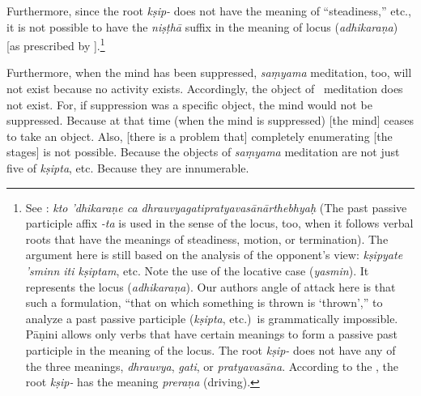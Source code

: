 Furthermore,%
 since the root \emph{kṣip-} does not have the
meaning of ``steadiness,'' etc., it is not possible to have the \emph{%
  niṣṭhā} suffix in the meaning of locus (\emph{adhikaraṇa}) [as prescribed by {%
  \Panini}].\footnote{See : \emph{kto ’dhikaraṇe ca dhrauvyagatipratyavasānārthebhyaḥ} (The past passive participle affix \emph{-ta\/} is used in the sense of the locus, too, when it follows verbal roots that have the meanings of steadiness, motion, or termination).  The argument here is still based on the analysis of the opponent's view: \emph{kṣipyate ’sminn iti kṣiptam}, etc.  Note the use of the locative case (\emph{yasmin}).  It represents the locus (\emph{adhikaraṇa}).  Our authors angle of attack here is that such a formulation, ``that on which something is thrown is `thrown'\thinspace,'' to analyze a past passive participle (\emph{kṣipta}, etc.)\ is grammatically impossible.  Pāṇini allows only verbs that have certain meanings to form a passive past participle in the meaning of the locus.  The root \emph{kṣip-} does not have any of the three meanings, \emph{dhrauvya}, \emph{gati}, or \emph{pratyavasāna}.  According to the \Dhatupatha, the root \emph{kṣip-} has the meaning \emph{preraṇa} (driving).}

Furthermore,%
 when the mind has been suppressed, \emph{saṃyama\/} meditation, too, will not exist because no activity exists.  Accordingly, the object of \samyama\ meditation does not exist.  For, if suppression was a specific object, the mind would not be suppressed.  Because at that time (when the mind is suppressed) [the mind] ceases to take an object.  Also, [there is a problem that] completely enumerating [the stages] is not possible.  Because the objects of \emph{saṃyama\/} meditation are not just five of \emph{kṣipta}, etc.  Because they are innumerable.

